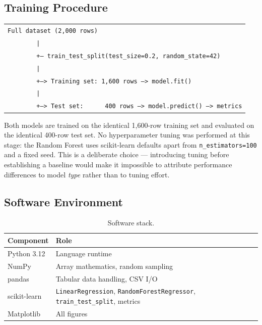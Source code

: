 \documentclass[11pt,a4paper]{article}
\begin{document}
\subsection{Training Procedure}

\begin{center}
\small
\begin{tabular}{@{}l@{}}
\texttt{Full dataset (2,000 rows)}\\
\texttt{\ \ \ \ \ \ \ \ |}\\
\texttt{\ \ \ \ \ \ \ \ +-- train\_test\_split(test\_size=0.2, random\_state=42)}\\
\texttt{\ \ \ \ \ \ \ \ |}\\
\texttt{\ \ \ \ \ \ \ \ +---> Training set: 1,600 rows  --->  model.fit()}\\
\texttt{\ \ \ \ \ \ \ \ |}\\
\texttt{\ \ \ \ \ \ \ \ +---> Test set:\ \ \ \ \ \ 400 rows  --->  model.predict()  --->  metrics}\\
\end{tabular}
\end{center}

Both models are trained on the identical 1{,}600-row training set and evaluated on the identical
400-row test set. No hyperparameter tuning was performed at this stage: the Random Forest uses
scikit-learn defaults apart from \texttt{n\_estimators=100} and a fixed seed. This is a deliberate
choice --- introducing tuning before establishing a baseline would make it impossible to attribute
performance differences to model \emph{type} rather than to tuning effort.

\subsection{Software Environment}

\begin{table}[h]
\centering
\small
\caption{Software stack.}
\begin{tabular}{@{}ll@{}}
\toprule
\textbf{Component} & \textbf{Role} \\
\midrule
Python 3.12  & Language runtime \\
NumPy        & Array mathematics, random sampling \\
pandas       & Tabular data handling, CSV I/O \\
scikit-learn & \texttt{LinearRegression}, \texttt{RandomForestRegressor},
               \texttt{train\_test\_split}, metrics \\
Matplotlib   & All figures \\
\bottomrule
\end{tabular}
\end{table}
\end{document}
